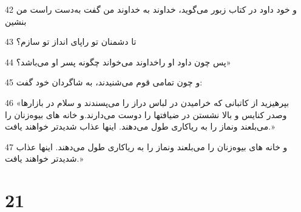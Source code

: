 \par 42 و خود داود در کتاب زبور می‌گوید، خداوند به خداوند من گفت به‌دست راست من بنشین
\par 43 تا دشمنان تو راپای انداز تو سازم؟
\par 44 پس چون داود او راخداوند می‌خواند چگونه پسر او می‌باشد؟»
\par 45 و چون تمامی قوم می‌شنیدند، به شاگردان خود گفت:
\par 46 «بپرهیزید از کاتبانی که خرامیدن در لباس دراز را می‌پسندند و سلام در بازارها وصدر کنایس و بالا نشستن در ضیافتها را دوست می‌دارند.و خانه های بیوه‌زنان را می‌بلعند ونماز را به ریاکاری طول می‌دهند. اینها عذاب شدیدتر خواهند یافت.»
\par 47 و خانه های بیوه‌زنان را می‌بلعند ونماز را به ریاکاری طول می‌دهند. اینها عذاب شدیدتر خواهند یافت.»

\chapter{21}

